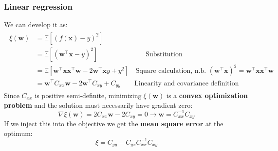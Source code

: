 \subsubsection{Linear regression}
We can develop it as:
\begin{align}
	\begin{split}
		\xi (\mathbf{w}) & = \mathbb{E}[(f(\mathbf{x}) -y)^2]\\
		& = \mathbb{E}[(\mathbf{w}^\top \mathbf{x}-y)^2] \qquad\qquad\qquad\quad \text{Substitution}\\
		& = \mathbb{E}[\mathbf{w}^\top \mathbf{x}\mathbf{x}^\top\mathbf{w}-2\mathbf{w}^\top\mathbf{x} y + y^2] \quad \text{Square calculation, n.b. } (\mathbf{w}^\top \mathbf{x})^2 = \mathbf{w}^\top \mathbf{x} \mathbf{x}^\top \mathbf{w}\\
		& = \mathbf{w}^\top C_{xx}\mathbf{w} - 2\mathbf{w}^\top C_{xy}+C_{yy} \qquad \text{Linearity and covariance definition}
		\label{eq:linregog}
	\end{split}
\end{align}
Since $C_{xx}$ is positive semi-definite, minimizing $\xi(\mathbf{w})$ is a \textbf{convex optimization problem} and the solution must necessarily have gradient zero:
\begin{equation}
	\nabla\xi(\mathbf{w}) = 2C_{xx}\mathbf{w} - 2C_{xy}=0 \longrightarrow \mathbf{w} = C_{xx}^{-1}C_{xy}
\end{equation}
If we inject this into the objective we get the \textbf{mean square error} at the optimum:
\begin{equation}
	\xi = C_{yy} - C_{yx}C^{-1}_{xx} C_{xy} \label{eq:linreg}
\end{equation}

